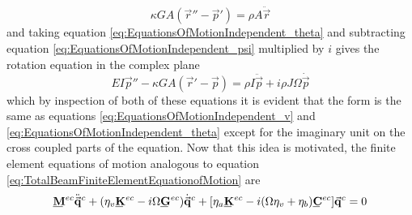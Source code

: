\begin{equation}\label{eq:EquationsOfMotionIndependent_r_complex}
\kappa GA(\vec{r}''-\vec{p}')=\rho A \ddot{\vec{r}}
\end{equation}
and taking equation \eqref{eq:EquationsOfMotionIndependent_theta} and subtracting equation \eqref{eq:EquationsOfMotionIndependent_psi} multiplied by $ i $ gives the rotation equation in the complex plane
\begin{equation}\label{key}
EI\vec{p}''-\kappa GA(\vec{r}'-\vec{p})=\rho I\ddot{\vec{p}}+i\rho J \Omega\dot{\vec{p}}
\end{equation}
which by inspection of both of these equations it is evident that the form is the same as equations \eqref{eq:EquationsOfMotionIndependent_v} and \eqref{eq:EquationsOfMotionIndependent_theta} except for the imaginary unit on the cross coupled parts of the equation. Now that this idea is motivated, the finite element equations of motion analogous to equation \eqref{eq:TotalBeamFiniteElementEquationofMotion} are
\begin{equation}\label{eq:TotalBeamFiniteElementEquationofMotionComplex]}
\bunderline{\mathbf{M}}^{ec}\ddot{\vec{\mathbf{q}}}^c+(\eta_v\bunderline{\mathbf{K}}^{ec}-i\Omega\bunderline{\mathbf{G}}^{ec})\dot{\vec{\mathbf{q}}}^c+[\eta_a\bunderline{\mathbf{K}}^{ec}-i(\Omega\eta_v+\eta_b)\bunderline{\mathbf{C}}^{ec}]\vec{\mathbf{q}}^c=0
\end{equation}
